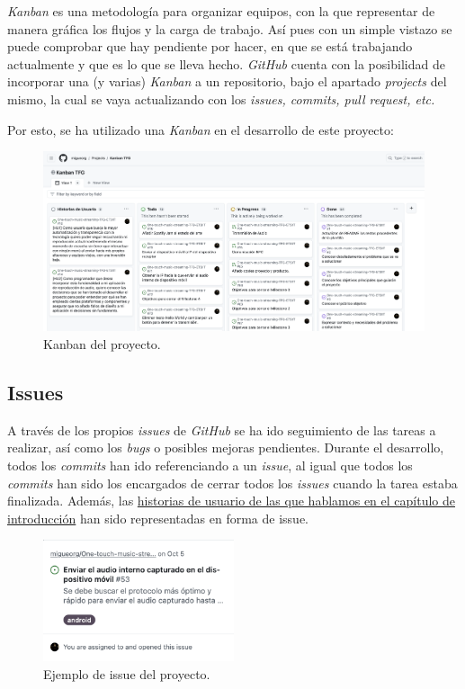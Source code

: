 \emph{Kanban} es una metodología para organizar equipos, con la que representar
de manera gráfica los flujos y la carga de trabajo. Así pues con un simple
vistazo se puede comprobar que hay pendiente por hacer, en que se está
trabajando actualmente y que es lo que se lleva hecho. \emph{GitHub} cuenta con
la posibilidad de incorporar una (y varias) \emph{Kanban} a un repositorio, bajo
el apartado \emph{projects} del mismo, la cual se vaya actualizando con los
\emph{issues, commits, pull request, etc.}

Por esto, se ha utilizado una \emph{Kanban} en el desarrollo de este proyecto:

\begin{figure}[H]
    \centering
    \includegraphics[width=\textwidth]{fotos/kanban.png}
    \caption{Kanban del proyecto.}
\end{figure}

\subsection{Issues}

A través de los propios \emph{issues} de \emph{GitHub} se ha ido seguimiento de
las tareas a realizar, así como los \emph{bugs} o posibles mejoras pendientes.
Durante el desarrollo, todos los \emph{commits} han ido referenciando a un
\emph{issue}, al igual que todos los \emph{commits} han sido los encargados de cerrar
todos los \emph{issues} cuando la tarea estaba finalizada. Además, las
\hyperref[historias-usuario]{historias de usuario de las que hablamos en el
capítulo de introducción} han sido representadas en forma de issue.

\begin{figure}[H]
    \centering
    \includegraphics[width=0.5\textwidth]{fotos/issues.png}
    \caption{Ejemplo de issue del proyecto.}
\end{figure}

